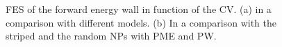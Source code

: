 \begin{figure}[pth]
	\centering
	\begin{adjustwidth}{-1.5cm}{-0.5cm}
		\caption{\acs{FES} of the forward energy wall in function of the \acs{CV}. (a) in a comparison with different models. (b) In a comparison with the striped and the random \acp{NP} with \acs{PME} and \acs{PW}.}%
		\label{fig:forwardWall}%
	
		\vspace*{\floatsep}%
	

\end{adjustwidth}
\end{figure}
